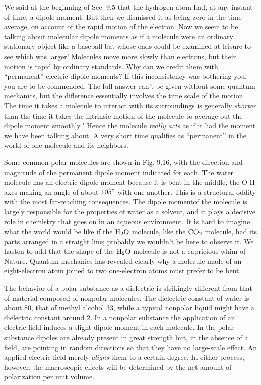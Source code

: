 We said at the beginning of Sec. 9.5 that the hydrogen atom had,
at any instant of time, a dipole moment. But then we dismissed it
as being zero in the time average, on account of the rapid motion of
the electron. Now we seem to be talking about molecular dipole
moments as if a molecule were an ordinary stationary object like a
baseball bat whose ends could be examined at leisure to see which
was larger! Molecules move more slowly than electrons, but their
motion is rapid by ordinary standards. Why can we credit them with
``permanent'' electric dipole moments? If this inconsistency was
bothering you, you are to be commended. The full answer can't be
given without some quantum mechanics, but the diflerence essentially
involves the time scale of the motion. The time it takes a molecule
to interact with its surroundings is generally \emph{shorter} than the
time it takes the intrinsic motion of the molecule to average out the
dipole moment smoothly." Hence the molecule \emph{really acts} as if it had
the moment we have been talking about. A very short time qualifies
as ``permanent'' in the world of one molecule and its neighbors.


Some common polar molecules are shown in Fig. 9.16, with the
direction and magnitude of the permanent dipole moment indicated
for each. The water molecule has an electric dipole moment because
it is bent in the middle, the O-H axes making an angle of about $105\mspace{0mu}^\circ$
with one another. This is a structural oddity with the most far-reaching
consequences. The dipole momentof the molecule is largely
responsible for the properties of water as a solvent, and it plays a
decisive role in chemistry that goes on in an aqueous environment.
It is hard to imagine what the world would be like if the $\textup{H}_2\textup{O}$ 
molecule, like the $\textup{CO}_2$ molecule, had its parts arranged in a straight line;
probably we wouldn't be here to observe it. We hasten to add that
the shape of the $\textup{H}_2\textup{O}$ molecule is not a capricious whim of Nature.
Quantum mechanics has revealed clearly why a molecule made of
an eight-electron atom joined to two one-electron atoms must prefer
to be bent.

The behavior of a polar substance as a dielectric is strikingly different
from that of material composed of nonpolar molecules. The
dielectric constant of water is about 80, that of methyl alcohol 33,
while a typical nonpolar liquid might have a dielectric constant
around 2. In a nonpolar substance the application of an electric field
induces a slight dipole moment in each molecule. In the polar substance
dipoles are already present in great strength but, in the
absence of a field, are pointing in random directions so that they have
no large-scale effect. An applied electric field merely \emph{aligns} them to
a certain degree. In either process, however, the macroscopic elfects
will be determined by the net amount of polarization per unit volume.

